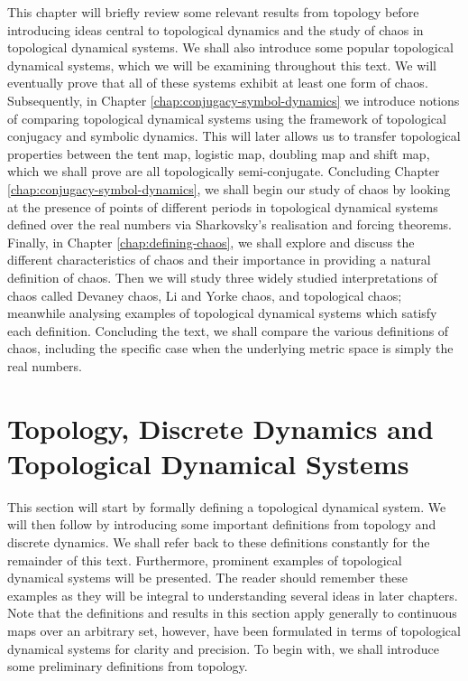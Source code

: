 This chapter will briefly review some relevant results from topology before introducing ideas central to topological dynamics and the study of chaos in topological dynamical systems. We shall also introduce some popular topological dynamical systems, which we will be examining throughout this text. We will eventually prove that all of these systems exhibit at least one form of chaos. Subsequently, in Chapter \ref{chap:conjugacy-symbol-dynamics} we introduce notions of comparing topological dynamical systems using the framework of topological conjugacy and symbolic dynamics. This will later allows us to transfer topological properties between the tent map, logistic map, doubling map and shift map, which we shall prove are all topologically semi-conjugate. Concluding Chapter \ref{chap:conjugacy-symbol-dynamics}, we shall begin our study of chaos by looking at the presence of points of different periods in topological dynamical systems defined over the real numbers via Sharkovsky's realisation and forcing theorems. Finally, in Chapter \ref{chap:defining-chaos}, we shall explore and discuss the different characteristics of chaos and their importance in providing a natural definition of chaos. Then we will study three widely studied interpretations of chaos called Devaney chaos, Li and Yorke chaos, and topological chaos; meanwhile analysing examples of topological dynamical systems which satisfy each definition. Concluding the text, we shall compare the various definitions of chaos, including the specific case when the underlying metric space is simply the real numbers.

\section{Topology, Discrete Dynamics and Topological Dynamical Systems} \label{sec:topological-dynamical-systems}
This section will start by formally defining a topological dynamical system. We will then follow by introducing some important definitions from topology and discrete dynamics. We shall refer back to these definitions constantly for the remainder of this text. Furthermore, prominent examples of topological dynamical systems will be presented. The reader should remember these examples as they will be integral to understanding several ideas in later chapters. Note that the definitions and results in this section apply generally to continuous maps over an arbitrary set, however, have been formulated in terms of topological dynamical systems for clarity and precision. To begin with, we shall introduce some preliminary definitions from topology.

